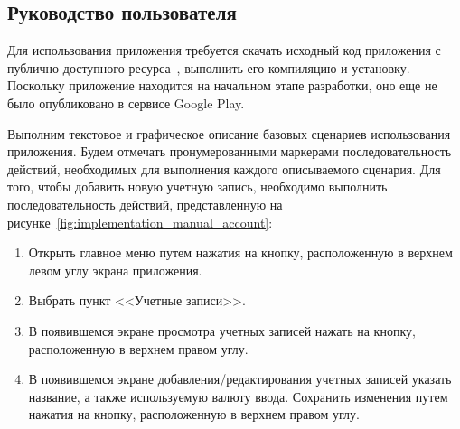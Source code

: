 \subsection{Руководство пользователя}

Для использования приложения требуется скачать исходный код
приложения с публично доступного ресурса~\cite{github_money_keeper},
выполнить его компиляцию и установку. Поскольку приложение
находится на начальном этапе разработки, оно еще не было
опубликовано в сервисе Google Play.

Выполним текстовое и графическое описание базовых сценариев использования приложения.
Будем отмечать пронумерованными маркерами последовательность действий,
необходимых для выполнения каждого описываемого сценария.
Для того, чтобы добавить новую учетную запись, необходимо выполнить
последовательность действий, представленную на
рисунке~\ref{fig:implementation_manual_account}:
\begin{enumerate}
  \item Открыть главное меню путем нажатия на кнопку,
    расположенную в верхнем левом углу экрана приложения.
  \item
    Выбрать пункт <<Учетные записи>>.
  \item В появившемся экране просмотра учетных записей
    нажать на кнопку, расположенную в верхнем правом углу.
  \item В появившемся экране добавления/редактирования
    учетных записей указать название, а также используемую валюту ввода.
    Сохранить изменения путем нажатия на кнопку, расположенную
    в верхнем правом углу.
\end{enumerate}

